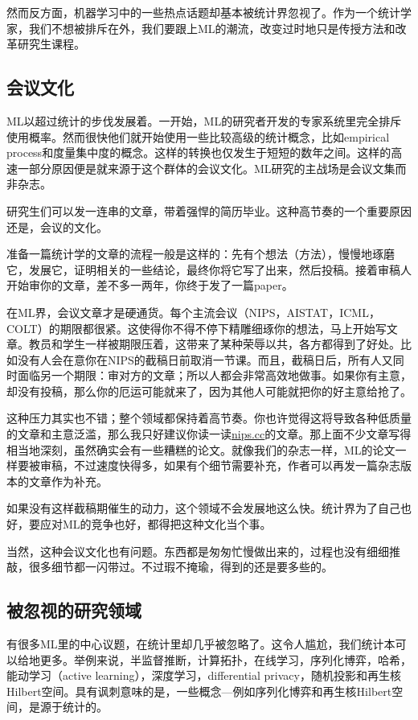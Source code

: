 \documentclass[]{article}
\begin{document}
然而反方面，机器学习中的一些热点话题却基本被统计界忽视了。作为一个统计学家，我们不想被排斥在外，我们要跟上ML的潮流，改变过时地只是传授方法和改革研究生课程。

\subsection{会议文化}

ML以超过统计的步伐发展着。一开始，ML的研究者开发的专家系统里完全排斥使用概率。然而很快他们就开始使用一些比较高级的统计概念，比如empirical process和度量集中度的概念。这样的转换也仅发生于短短的数年之间。这样的高速一部分原因便是就来源于这个群体的会议文化。ML研究的主战场是会议文集而非杂志。

研究生们可以发一连串的文章，带着强悍的简历毕业。这种高节奏的一个重要原因还是，会议的文化。 

准备一篇统计学的文章的流程一般是这样的：先有个想法（方法），慢慢地琢磨它，发展它，证明相关的一些结论，最终你将它写了出来，然后投稿。接着审稿人开始审你的文章，差不多一两年，你终于发了一篇paper。

在ML界，会议文章才是硬通货。每个主流会议（NIPS，AISTAT，ICML，COLT）的期限都很紧。这使得你不得不停下精雕细琢你的想法，马上开始写文章。教员和学生一样被期限压着，这带来了某种荣辱以共，各方都得到了好处。比如没有人会在意你在NIPS的截稿日前取消一节课。而且，截稿日后，所有人又同时面临另一个期限：审对方的文章；所以人都会非常高效地做事。如果你有主意，却没有投稿，那么你的厄运可能就来了，因为其他人可能就把你的好主意给抢了。

这种压力其实也不错；整个领域都保持着高节奏。你也许觉得这将导致各种低质量的文章和主意泛滥，那么我只好建议你读一读\url{nips.cc}的文章。那上面不少文章写得相当地深刻，虽然确实会有一些糟糕的论文。就像我们的杂志一样，ML的论文一样要被审稿，不过速度快得多，如果有个细节需要补充，作者可以再发一篇杂志版本的文章作为补充。

如果没有这样截稿期催生的动力，这个领域不会发展地这么快。统计界为了自己也好，要应对ML的竞争也好，都得把这种文化当个事。

当然，这种会议文化也有问题。东西都是匆匆忙慢做出来的，过程也没有细细推敲，很多细节都一闪带过。不过瑕不掩瑜，得到的还是要多些的。

\subsection{被忽视的研究领域}

有很多ML里的中心议题，在统计里却几乎被忽略了。这令人尴尬，我们统计本可以给地更多。举例来说，半监督推断，计算拓扑，在线学习，序列化博弈，哈希，能动学习（active learning），深度学习，differential privacy，随机投影和再生核Hilbert空间。具有讽刺意味的是，一些概念---例如序列化博弈和再生核Hilbert空间，是源于统计的。
\end{document}
